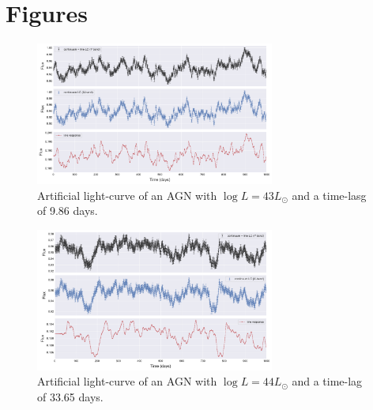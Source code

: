 \documentclass[letterpaper, oneside]{article}
\begin{document}





\section*{Figures}


\begin{figure}[h]
	\centering
	\includegraphics[width=0.7\textwidth]{../lc_plots/art_lcs_logL43.pdf}
	\caption{Artificial light-curve of an AGN with $\log L = 43 L_{\odot}$ and a time-lasg of 9.86 days.}
	\label{fig:art_lcs_L43}
\end{figure}

\begin{figure}[h]
	\centering
	\includegraphics[width=0.7\textwidth]{../lc_plots/art_lcs_logL44.pdf}
	\caption{Artificial light-curve of an AGN with $\log L = 44 L_{\odot}$ and a time-lag of 33.65 days.}
	\label{fig:art_lcs_L44}
\end{figure}
\end{document}
